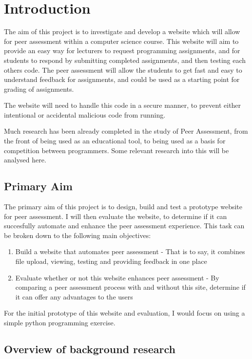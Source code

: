 \documentclass[a4paper,11pt]{report}
\begin{document}
\section{Introduction}
The aim of this project is to investigate and develop a website which will allow for peer assessment within a computer science course. This website will aim to provide an easy way for lecturers to request programming assignments, and for students to respond by submitting completed assignments, and then testing each others code. The peer assessment will allow the students to get fast and easy to understand feedback for assignments, and could be used as a starting point for grading of assignments.\par
The website will need to handle this code in a secure manner, to prevent either intentional or accidental malicious code from running.\par
Much research has been already completed in the study of Peer Assessment, from the front of being used as an educational tool, to being used as a basis for competition between programmers. Some relevant research into this will be analysed here.

\subsection{Primary Aim}
The primary aim of this project is to design, build and test a prototype website for peer assessment. I will then evaluate the website, to determine if it can succesfully automate and enhance the peer assessment experience. This task can be broken down to the following main objectives:
\begin{enumerate}
\item Build a website that automates peer assessment - That is to say, it combines file upload, viewing, testing and providing feedback in one place
\item Evaluate whether or not this website enhances peer assessment - By comparing a peer assessment process with and without this site, determine if it can offer any advantages to the users
\end{enumerate}
For the initial prototype of this website and evaluation, I would focus on using a simple python programming exercise.
\subsection{Overview of background research}
\end{document}
